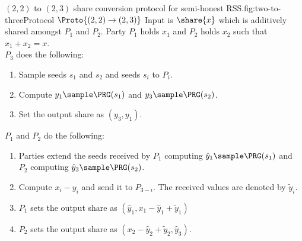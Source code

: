 
\begin{Boxfig}{$(2,2)$ to $(2,3)$ share conversion protocol for semi-honest
RSS.}{fig:two-to-three}{Protocol $\Proto{(2,2) \rightarrow (2,3)}$}
Input is $\share{x}$ which is additively shared amongst $P_1$ and $P_2$. Party $P_1$ holds $x_1$ and $P_2$ holds $x_2$ 
such that $x_1 + x_2 = x$. \\
$P_3$ does the following:
  \begin{enumerate}
    \item Sample seeds $s_1$ and $s_2$ and seeds $s_i$ to $P_i$.
    \item Compute $y_1 \sample \PRG(s_1)$ and $y_3 \sample \PRG(s_2)$.
    \item Set the output share as $(y_3, y_1)$.
 \end{enumerate}

$P_1$ and $P_2$ do the following:
\begin{enumerate}
   \item Parties extend the seeds received by $P_1$ computing $\hat{y}_1 \sample \PRG(s_1)$ and $P_2$ computing
   $\hat{y}_3 \sample \PRG(s_2)$.
   \item Compute $x_i - y_i$ and send it to $P_{3-i}$. 
   The received values are denoted by $\tilde{y}_i$.
   \item $P_1$ sets the output share as $(\hat{y}_1, x_1 - \hat{y}_1  + \tilde{y}_1)$
   \item $P_2$ sets the output share as $(x_2 - \hat{y}_2 + \tilde{y}_2, \hat{y}_3)$.
 \end{enumerate}
\end{Boxfig}

